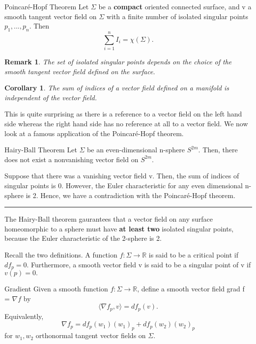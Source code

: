 \documentclass[twoside]{article}
\newtheorem{corollary}[theorem]{Corollary}
\newtheorem{remark}[theorem]{Remark}
\newenvironment{proof}{{\bf Proof:}}{\hfill\rule{2mm}{2mm}}
\begin{document}
\begin{theorem_exam}{Poincaré-Hopf Theorem}{} Let $\Sigma$ be a \textbf{compact} oriented connected surface, and v a smooth tangent vector field on $\Sigma$ with a finite number of isolated singular points $p_1,...,p_n.$ Then 
$$
\sum_{i=1}^nI_i = \chi(\Sigma).
$$
\end{theorem_exam}
\begin{remark}The set of isolated singular points depends on the choice of the smooth tangent vector field defined on the surface.
\end{remark}
\begin{corollary}The sum of indices of a vector field defined on a manifold is independent of the vector field.
\end{corollary}

This is quite surprising as there is a reference to a vector field on the left hand side whereas the right hand side has no reference at all to a vector field. We now look at a famous application of the Poincaré-Hopf theorem.

\begin{theorem_exam}{Hairy-Ball Theorem}{} Let $\Sigma$ be an even-dimensional n-sphere $S^{2m}.$ Then, there does not exist a nonvanishing vector field on $S^{2m}.$
\end{theorem_exam}
\begin{proof} Suppose that there was a vanishing vector field v. Then, the sum of indices of singular points is 0. However, the Euler characteristic for any even dimensional n-sphere is 2. Hence, we have a contradiction with the Poincaré-Hopf theorem.
\end{proof}

The Hairy-Ball theorem gaurantees that a vector field on any surface homeomorphic to a sphere must have \textbf{at least two} isolated singular points, because the Euler characteristic of the 2-sphere is 2.

Recall the two definitions. A function $f: \Sigma \rightarrow \mathbb{R}$ is said to be a critical point if $df_p = 0.$ Furthermore, a smooth vector field v is said to be a singular point of v if $v(p) = 0.$
\begin{definition_exam}{Gradient}{} Given a smooth function $f: \Sigma \rightarrow \mathbb{R}$, define a smooth vector field grad f = $\nabla f$ by 
$$
\langle \nabla f_p, v \rangle = df_p(v).
$$
Equivalently, 
$$
\nabla f_p = df_p(w_1)(w_1)_p + df_p(w_2)(w_2)_p
$$
for $w_1,w_2$ orthonormal tangent vector fields on $\Sigma.$
\end{definition_exam}
\end{document}
